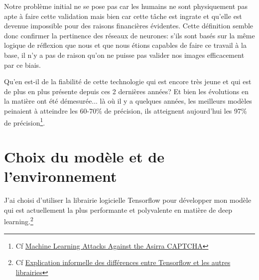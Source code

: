 \documentclass[a4paper,12pt]{report}
\begin{document}
    \medbreak
    Notre problème initial ne se pose pas car les humains ne sont physiquement pas apte à faire cette validation mais bien car cette tâche est ingrate et qu'elle est devenue impossible pour des raisons financières évidentes. Cette définition semble donc confirmer la pertinence des réseaux de neurones: s'ils sont basés sur la même logique de réflexion que nous et que nous étions capables de faire ce travail à la base, il n'y a pas de raison qu'on ne puisse pas valider nos images efficacement par ce biais.
    \bigbreak

    Qu'en est-il de la fiabilité de cette technologie qui est encore très jeune et qui est de plus en plus présente depuis ces 2 dernières années? Et bien les évolutions en la matière ont été démesurée... là où il y a quelques années, les meilleurs modèles peinaient à atteindre les 60-70\% de précision, ils atteignent aujourd'hui les 97\% de précision\footnote{Cf \href{http://xenon.stanford.edu/~pgolle/papers/dogcat.pdf}{Machine Learning Attacks Against the Asirra CAPTCHA}}.


    \section{Choix du modèle et de l'environnement}

    J'ai choisi d'utiliser la librairie logicielle Tensorflow pour développer mon modèle qui est actuellement la plus performante et polyvalente en matière de deep learning.\footnote{Cf \href{https://www.quora.com/Is-TensorFlow-better-than-other-leading-libraries-such-as-Torch-Theano}{Explication informelle des différences entre Tensorflow et les autres librairies}}
    \medbreak
    \bigbreak
    
\end{document}

